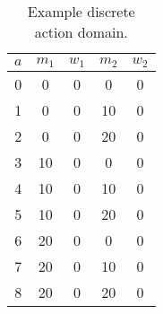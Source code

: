 %

\begin{table}
\caption{Example discrete action domain.}
\label{tbl:example_actions}
\begin{center}
\begin{tabular}{c|c|c|c|c}
\hline
$a$ &$m_1$ &$w_1$ &$m_2$ &$w_2$ \\
\hline
 0 &0 &0 &0 &0 \\
 1 &0 &0 &10 &0 \\
 2 &0 &0 &20 &0 \\
 3 &10 &0 &0 &0 \\
 4 &10 &0 &10 &0 \\
 5 &10 &0 &20 &0 \\
 6 &20 &0 &0 &0 \\
 7 &20 &0 &10 &0 \\
 8 &20 &0 &20 &0 \\
\hline
\end{tabular}
\end{center}
\end{table}


